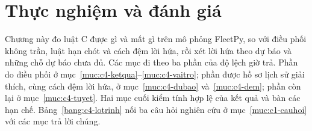 
\chapter{Thực nghiệm và đánh giá}
\label{chuong:thucnghiem}

Chương này đo luật C được gì và mất gì trên mô phỏng FleetPy, so với điều phối không trần, luật hạn
chót và cách đệm lời hứa, rồi xét lời hứa theo dự báo và những chỗ dự báo chưa đủ. Các mục đi theo ba
phần của độ lệch giờ trả. Phần do điều phối ở mục~\ref{muc:c4-ketqua}--\ref{muc:c4-vaitro}; phần được hồ
sơ lịch sử giải thích, cùng cách đệm lời hứa, ở mục~\ref{muc:c4-dubao} và~\ref{muc:c4-dem}; phần còn lại
ở mục~\ref{muc:c4-tuyet}. Hai mục cuối kiểm tính hợp lệ của kết quả và bàn các hạn chế.
Bảng~\ref{bang:c4-lotrinh} nối ba câu hỏi nghiên cứu ở mục~\ref{muc:c1-cauhoi} với các mục trả lời chúng.


